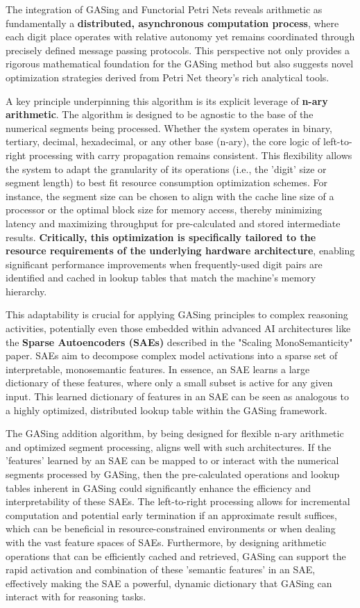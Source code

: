 The integration of GASing and Functorial Petri Nets reveals arithmetic as fundamentally a \textbf{distributed, asynchronous computation process}, where each digit place operates with relative autonomy yet remains coordinated through precisely defined message passing protocols. This perspective not only provides a rigorous mathematical foundation for the GASing method but also suggests novel optimization strategies derived from Petri Net theory's rich analytical tools.

A key principle underpinning this algorithm is its explicit leverage of \textbf{n-ary arithmetic}. The algorithm is designed to be agnostic to the base of the numerical segments being processed. Whether the system operates in binary, tertiary, decimal, hexadecimal, or any other base (n-ary), the core logic of left-to-right processing with carry propagation remains consistent. This flexibility allows the system to adapt the granularity of its operations (i.e., the 'digit' size or segment length) to best fit resource consumption optimization schemes. For instance, the segment size can be chosen to align with the cache line size of a processor or the optimal block size for memory access, thereby minimizing latency and maximizing throughput for pre-calculated and stored intermediate results. \textbf{Critically, this optimization is specifically tailored to the resource requirements of the underlying hardware architecture}, enabling significant performance improvements when frequently-used digit pairs are identified and cached in lookup tables that match the machine's memory hierarchy.

This adaptability is crucial for applying GASing principles to complex reasoning activities, potentially even those embedded within advanced AI architectures like the \textbf{Sparse Autoencoders (SAEs)} described in the "Scaling MonoSemanticity" paper. SAEs aim to decompose complex model activations into a sparse set of interpretable, monosemantic features. In essence, an SAE learns a large dictionary of these features, where only a small subset is active for any given input. This learned dictionary of features in an SAE can be seen as analogous to a highly optimized, distributed lookup table within the GASing framework. 

The GASing addition algorithm, by being designed for flexible n-ary arithmetic and optimized segment processing, aligns well with such architectures. If the 'features' learned by an SAE can be mapped to or interact with the numerical segments processed by GASing, then the pre-calculated operations and lookup tables inherent in GASing could significantly enhance the efficiency and interpretability of these SAEs. The left-to-right processing allows for incremental computation and potential early termination if an approximate result suffices, which can be beneficial in resource-constrained environments or when dealing with the vast feature spaces of SAEs. Furthermore, by designing arithmetic operations that can be efficiently cached and retrieved, GASing can support the rapid activation and combination of these 'semantic features' in an SAE, effectively making the SAE a powerful, dynamic dictionary that GASing can interact with for reasoning tasks.

